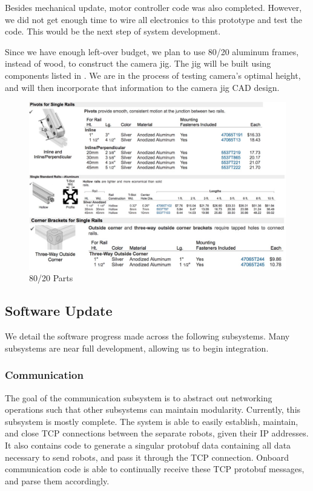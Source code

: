 Besides mechanical update, motor controller code was also completed. However, we did not get enough time to wire all electronics to this prototype and test the code. This would be the next step of system development.

Since we have enough left-over budget, we plan to use 80/20 aluminum frames, instead of wood, to construct the camera jig. The jig will be built using components listed in . We are in the process of testing camera’s optimal height, and will then incorporate that information to the camera jig CAD design.

\begin{figure}[h!]
\centering
\includegraphics[width=0.98\columnwidth]{CAD/8020.jpeg}
\caption{80/20 Parts}
\label{fig:em4}
\end{figure}

\subsection{Software Update}
\label{sec:software_progress}
We detail the software progress made across the following subsystems. Many subsystems are near full development, allowing us to begin integration. 

\subsubsection{Communication}
The goal of the communication subsystem is to abstract out networking operations such that other subsystems can maintain modularity. Currently, this subsystem is mostly complete. The system is able to easily establish, maintain, and close TCP connections between the separate robots, given their IP addresses. It also contains code to generate a singular protobuf data containing all data necessary to send robots, and pass it through the TCP connection. Onboard communication code is able to continually receive these TCP protobuf messages, and parse them accordingly.

